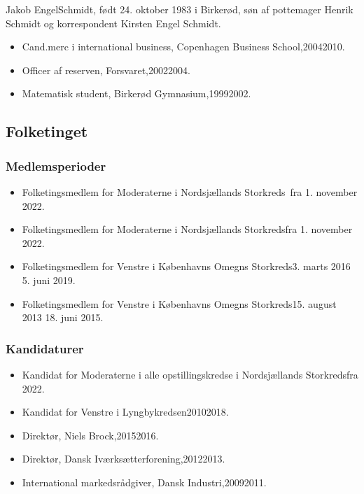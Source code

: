 \documentclass[11pt, a4paper]{awesome-cv}
\begin{document}
\makecvheader[R]
\makelettertitle
\begin{cvletter}
Jakob EngelSchmidt, født 24. oktober 1983 i Birkerød, søn af pottemager Henrik Schmidt og korrespondent Kirsten Engel Schmidt.

\begin{itemize}
\item Cand.merc i international business, Copenhagen Business School,20042010.
\item Officer af reserven, Forsvaret,20022004.
\item Matematisk student, Birkerød Gymnasium,19992002.
\end{itemize}
\subsection*{Folketinget}
\subsubsection*{Medlemsperioder}
\begin{itemize}
\item Folketingsmedlem for Moderaterne i Nordsjællands Storkreds fra 1. november 2022.
\item Folketingsmedlem for Moderaterne i Nordsjællands Storkredsfra 1. november 2022.
\item Folketingsmedlem for Venstre i Københavns Omegns Storkreds3. marts 2016  5. juni 2019.
\item Folketingsmedlem for Venstre i Københavns Omegns Storkreds15. august 2013  18. juni 2015.
\end{itemize}
\subsubsection*{Kandidaturer}
\begin{itemize}
\item Kandidat for Moderaterne i alle opstillingskredse i Nordsjællands Storkredsfra 2022.
\item Kandidat for Venstre i Lyngbykredsen20102018.
\end{itemize}
\begin{itemize}
\item Direktør, Niels Brock,20152016.
\item Direktør, Dansk Iværksætterforening,20122013.
\item International markedsrådgiver, Dansk Industri,20092011.
\end{itemize}
\end{cvletter}
\end{document}
